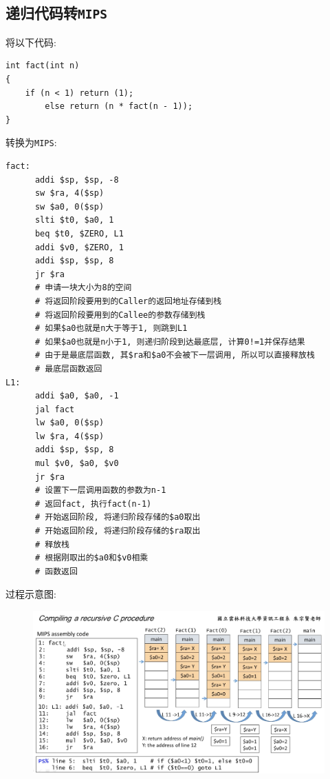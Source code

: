 \subsection{递归代码转\texttt{MIPS}}
将以下代码:
\begin{lstlisting}
int fact(int n)
{
    if (n < 1) return (1);
        else return (n * fact(n - 1));
}
\end{lstlisting}\par
转换为\texttt{MIPS}:
\begin{lstlisting}
fact:
      addi $sp, $sp, -8
      sw $ra, 4($sp)
      sw $a0, 0($sp)
      slti $t0, $a0, 1
      beq $t0, $ZERO, L1
      addi $v0, $ZERO, 1
      addi $sp, $sp, 8
      jr $ra
      # 申请一块大小为8的空间
      # 将返回阶段要用到的Caller的返回地址存储到栈
      # 将返回阶段要用到的Callee的参数存储到栈
      # 如果$a0也就是n大于等于1, 则跳到L1
      # 如果$a0也就是n小于1, 则递归阶段到达最底层, 计算0!=1并保存结果
      # 由于是最底层函数, 其$ra和$a0不会被下一层调用, 所以可以直接释放栈
      # 最底层函数返回
L1:
      addi $a0, $a0, -1
      jal fact
      lw $a0, 0($sp)
      lw $ra, 4($sp)
      addi $sp, $sp, 8
      mul $v0, $a0, $v0
      jr $ra
      # 设置下一层调用函数的参数为n-1
      # 返回fact, 执行fact(n-1)
      # 开始返回阶段, 将递归阶段存储的$a0取出
      # 开始返回阶段, 将递归阶段存储的$ra取出
      # 释放栈
      # 根据刚取出的$a0和$v0相乘
      # 函数返回
\end{lstlisting}\par 
过程示意图:
\begin{figure}[H]
\centering
\includegraphics[scale=.5]{img/figure2.png}
\end{figure}
